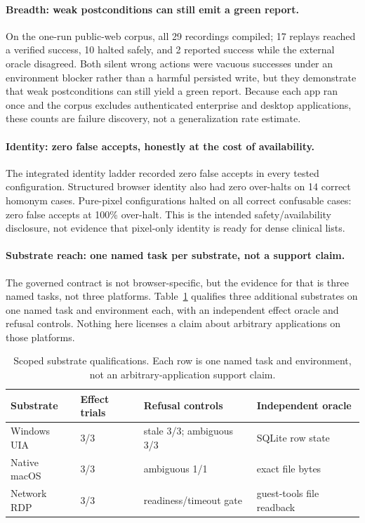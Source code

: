 \paragraph{Breadth: weak postconditions can still emit a green report.}
On the one-run public-web corpus, all 29 recordings compiled; 17 replays reached
a verified success, 10 halted safely, and 2 reported success while the external
oracle disagreed. Both silent wrong actions were vacuous successes under an
environment blocker rather than a harmful persisted write, but they demonstrate
that weak postconditions can still yield a green report. Because each app ran
once and the corpus excludes authenticated enterprise and desktop applications,
these counts are failure discovery, not a generalization rate estimate.

\paragraph{Identity: zero false accepts, honestly at the cost of availability.}
The integrated identity ladder recorded zero false accepts in every tested
configuration. Structured browser identity also had zero over-halts on 14
correct homonym cases. Pure-pixel configurations halted on all correct
confusable cases: zero false accepts at 100\% over-halt. This is the intended
safety/availability disclosure, not evidence that pixel-only identity is ready
for dense clinical lists.

\paragraph{Substrate reach: one named task per substrate, not a support claim.}
The governed contract is not browser-specific, but the evidence for that is
three named tasks, not three platforms. Table~\ref{tab:substrates}
qualifies three additional substrates on one named task and environment each,
with an independent effect oracle and refusal controls. Nothing here licenses a
claim about arbitrary applications on those platforms.

\begin{table}[t]
\centering
\caption{Scoped substrate qualifications. Each row is one named task and
environment, not an arbitrary-application support claim.}
\label{tab:substrates}
\begin{tabular}{llll}
\toprule
Substrate & Effect trials & Refusal controls & Independent oracle \\
\midrule
Windows UIA & 3/3 & stale 3/3; ambiguous 3/3 & SQLite row state \\
Native macOS & 3/3 & ambiguous 1/1 & exact file bytes \\
Network RDP & 3/3 & readiness/timeout gate & guest-tools file readback \\
\bottomrule
\end{tabular}
\end{table}

